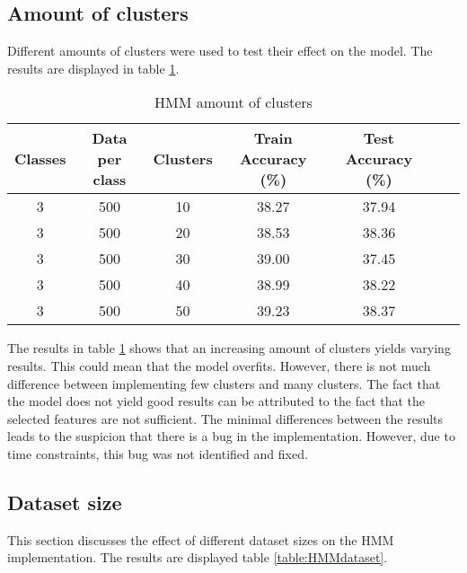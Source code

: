 \subsection*{Amount of clusters}
Different amounts of clusters were used to test their effect on the model. The results are displayed in table \ref{table:HMMclusters}.
\begin{table}[h!]
\begin{center}
\begin{tabular}{| c | c | c | c | c | c | c |}
\hline
 {\textbf{Classes}} 	 
 & {\textbf{Data per class}} 					& {\textbf{Clusters}} 
 & {\textbf{Train Accuracy (\%)}} 					& {\textbf{Test Accuracy (\%)}} 
 \\
\hline
3 	 		& 500 		& 10			& 38.27		& 37.94		\\
3 	 		& 500 		& 20			& 38.53		& 38.36		\\
3 	 		& 500 		& 30			& 39.00		& 37.45		\\
3 	 		& 500 		& 40			& 38.99		& 38.22		\\
3 	 		& 500 		& 50			& 39.23		& 38.37		\\
\hline
\end{tabular}
\caption{HMM amount of clusters}
\label{table:HMMclusters}
\end{center}
\end{table}

The results in table \ref{table:HMMclusters} shows that an increasing amount of clusters yields varying results. This could mean that the model overfits. However, there is not much difference between implementing few clusters and many clusters. The fact that the model does not yield good results can be attributed to the fact that the selected features are not sufficient. The minimal differences between the results leads to the suspicion that there is a bug in the implementation. However, due to time constraints, this bug was not identified and fixed.

\subsection{Dataset size}
This section discusses the effect of different dataset sizes on the HMM implementation. The results are displayed table \ref{table:HMMdataset}.


